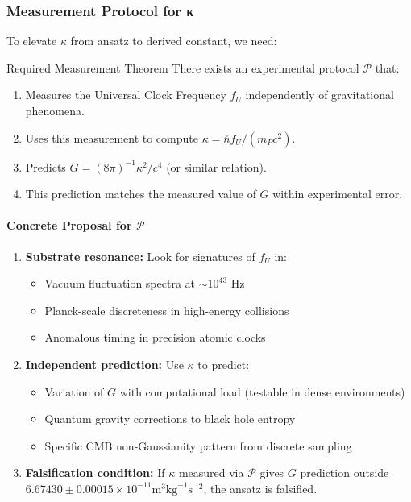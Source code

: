 \documentclass[11pt,titlepage]{article}
\begin{document}
\subsubsection{Measurement Protocol for κ}
To elevate $\kappa$ from ansatz to derived constant, we need:

\begin{mytheorem}{Required Measurement Theorem}
\label{thm:kappa-measurement}
There exists an experimental protocol $\mathcal{P}$ that:
\begin{enumerate}
\item Measures the Universal Clock Frequency $f_U$ independently of gravitational phenomena.
\item Uses this measurement to compute $\kappa = \hbar f_U / (m_P c^2)$.
\item Predicts $G = (8\pi)^{-1} \kappa^2 / c^4$ (or similar relation).
\item This prediction matches the measured value of $G$ within experimental error.
\end{enumerate}
\end{mytheorem}

\paragraph{Concrete Proposal for $\mathcal{P}$}
\begin{enumerate}
\item \textbf{Substrate resonance:} Look for signatures of $f_U$ in:
\begin{itemize}
\item Vacuum fluctuation spectra at $\sim 10^{43}$ Hz
\item Planck-scale discreteness in high-energy collisions
\item Anomalous timing in precision atomic clocks
\end{itemize}

\item \textbf{Independent prediction:} Use $\kappa$ to predict:
\begin{itemize}
\item Variation of $G$ with computational load (testable in dense environments)
\item Quantum gravity corrections to black hole entropy
\item Specific CMB non-Gaussianity pattern from discrete sampling
\end{itemize}

\item \textbf{Falsification condition:} If $\kappa$ measured via $\mathcal{P}$ gives $G$ prediction outside $6.67430 \pm 0.00015 \times 10^{-11} \text{m}^3\text{kg}^{-1}\text{s}^{-2}$, the ansatz is falsified.
\end{enumerate}
\end{document}
